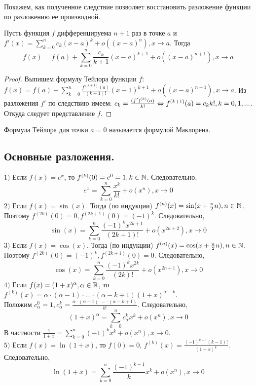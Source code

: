 Покажем, как полученное следствие позволяет восстановить разложение функции по разложению ее производной.

\begin{note}
    Пусть функция $f$ дифференцируема $n + 1$ раз в точке $a$ и \\ $f'(x) = \sum\limits_{k = 0}^{n} c_{k} (x-a)^{k} + o((x - a)^{n}), x \to a$. Тогда 
    \[f(x) = f(a) + \sum\limits_{k = 0}^{n}\frac{c_{k}}{k + 1} (x-a)^{k + 1} + o((x - a)^{n+1}), x \to a\]
\end{note}

\begin{proof}
    Выпишем формулу Тейлора функции $f$: $f(x) = f(a) + \sum\limits_{k = 0}^{n}\frac{f^{(k+1)}(a)}{(k + 1)!} (x-1)^{k + 1} + o((x - a)^{n+1}), x \to a$. Из разложения $f'$ по следствию имеем: $c_{k} = \frac{(f')^{(k)}(a)}{k!} \Leftrightarrow f^{(k+1)}(a) = c_{k}k!, k = 0, 1, ...$. Откуда следует представление $f$.
\end{proof}

Формула Тейлора для точки $a = 0$ называется формулой Маклорена.

\subsection{Основные разложения.}
    $1)$ Если $f(x) = e^{x}$, то $f^{(k)}(0) = e^{0} = 1, k \in \mathbb{N}$. Следовательно, 
    \[e^{x} = \sum_{k=0}^{n}\frac{x^{k}}{k!} + o(x^{n}), x \to 0\]
    $2)$ Если $f(x) = \sin(x)$. Тогда (по индукции) $f^{(n)}(x) = \sin(x + \frac{\pi}{2}n), n \in \mathbb{N}$. Поэтому $f^{(2k)}(0) = 0, f^{(2k+1)}(0) = (-1)^{k}$. Следовательно, 
    \[\sin(x) = \sum_{k = 0}^{n} \frac{(-1)^{k} x^{2k+1}}{(2k+1)!} + o(x^{2n+2}), x \to 0\]
    $3)$ Если $f(x) = \cos(x)$. Тогда (по индукции) $f^{(n)}(x) = \cos(x + \frac{\pi}{2}n), n \in \mathbb{N}$. Поэтому $f^{(2k)}(0) = (-1)^{k}, f^{(2k + 1)}(0) = 0$. Следовательно, 
    \[\cos(x) = \sum_{k = 0}^{n} \frac{(-1)^{k} x^{2k}}{(2k)!} + o(x^{2n+1}), x \to 0\]
    $4)$ Если $f(x) = (1+x)^{\alpha}, \alpha \in \mathbb{R}$, то $f^{(k)}(x) = \alpha \cdot (\alpha - 1) \cdot ... \cdot (\alpha - k + 1)(1+x)^{\alpha - k}$. \\
    Положим $c_{\alpha}^{0} = 1, c_{\alpha}^{k} = \frac{\alpha \cdot (\alpha - 1) \cdot ... \cdot (\alpha - k + 1)}{k!}$. Следовательно, 
    \[(1+x)^{\alpha} = \sum_{k = 0}^{n} c_{\alpha}^{k}x^{k} + o(x^{n}), x \to 0\]
    В частности $\frac{1}{1+x} = \sum_{k = 0}^{n} (-1)^{k} x^{k} + o(x^{n}), x \to 0$. \\
    $5)$ Если $f(x) = \ln(1+x)$, то $f(0) = 0$, $f^{(k)}(x) = \frac{(-1)^{k-1}(k-1)!}{(1+x)^{k}}$. Следовательно,
    \[\ln(1+x) = \sum_{k = 0}^{n} \frac{(-1)^{k-1}}{k}x^{k} + o(x^{n}), x \to 0\]

